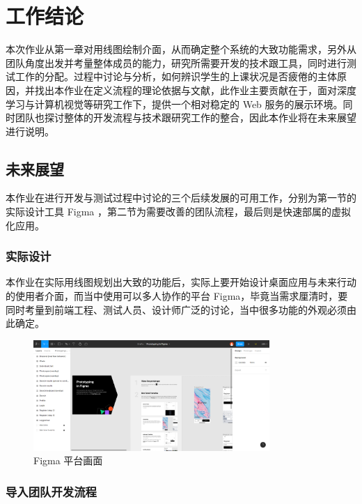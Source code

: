 \chapter{工作结论}
\label{chap:5}

本次作业从第一章对用线图绘制介面，从而确定整个系统的大致功能需求，另外从团队角度出发并考量整体成员的能力，研究所需要开发的技术跟工具，同时进行测试工作的分配。过程中讨论与分析，如何辨识学生的上课状况是否疲倦的主体原因，并找出本作业在定义流程的理论依据与文献，此作业主要贡献在于，面对深度学习与计算机视觉等研究工作下，提供一个相对稳定的 Web 服务的展示环境。同时团队也探讨整体的开发流程与技术跟研究工作的整合，因此本作业将在未来展望进行说明。

\section{未来展望}

本作业在进行开发与测试过程中讨论的三个后续发展的可用工作，分别为第一节的实际设计工具 Figma ，第二节为需要改善的团队流程，最后则是快速部属的虚拟化应用。

\subsection{实际设计}

本作业在实际用线图规划出大致的功能后，实际上要开始设计桌面应用与未来行动的使用者介面，而当中使用可以多人协作的平台 Figma，毕竟当需求厘清时，要同时考量到前端工程、测试人员、设计师广泛的讨论，当中很多功能的外观必须由此确定。

\begin{figure}[htb]
\centering 
\includegraphics[width=0.80\textwidth]{img/ch5m1.png} 
\caption{Figma 平台画面}
\label{Test}
\end{figure}

\subsection{导入团队开发流程}

